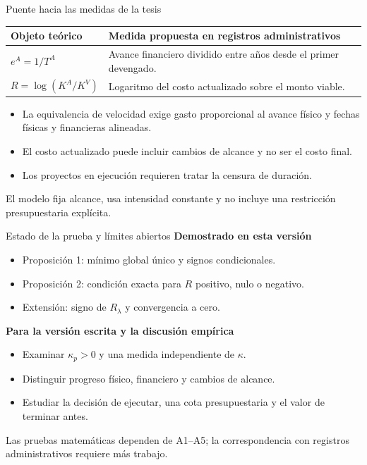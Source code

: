 \documentclass[aspectratio=169,11pt]{beamer}
\newcommand{\nota}[1]{\par\vfill{\footnotesize\color{blue}#1}}
\begin{document}
\begin{frame}{Puente hacia las medidas de la tesis}
\begin{tabular}{p{.24\linewidth}p{.66\linewidth}}
\toprule
Objeto teórico & Medida propuesta en registros administrativos \\\midrule
$e^A=1/T^A$ & Avance financiero dividido entre años desde el primer devengado. \\
$R=\log(K^A/K^V)$ & Logaritmo del costo actualizado sobre el monto viable. \\\bottomrule
\end{tabular}
\medskip
\begin{itemize}
\item La equivalencia de velocidad exige gasto proporcional al avance físico y fechas físicas y financieras alineadas.
\item El costo actualizado puede incluir cambios de alcance y no ser el costo final.
\item Los proyectos en ejecución requieren tratar la censura de duración.
\end{itemize}
\nota{El modelo fija alcance, usa intensidad constante y no incluye una restricción presupuestaria explícita.}
\end{frame}

\begin{frame}{Estado de la prueba y límites abiertos}
\textbf{Demostrado en esta versión}
\begin{itemize}
\item Proposición 1: mínimo global único y signos condicionales.
\item Proposición 2: condición exacta para $R$ positivo, nulo o negativo.
\item Extensión: signo de $R_{\lambda}$ y convergencia a cero.
\end{itemize}
\medskip
\textbf{Para la versión escrita y la discusión empírica}
\begin{itemize}
\item Examinar $\kappa_p>0$ y una medida independiente de $\kappa$.
\item Distinguir progreso físico, financiero y cambios de alcance.
\item Estudiar la decisión de ejecutar, una cota presupuestaria y el valor de terminar antes.
\end{itemize}
\nota{Las pruebas matemáticas dependen de A1--A5; la correspondencia con registros administrativos requiere más trabajo.}
\end{frame}
\end{document}
